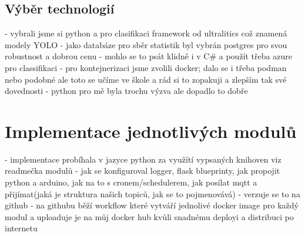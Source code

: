 \subsection{Výběr technologií}\label{subsec:vyber-technologii}
- vybrali jsme si python a pro clasifikaci framework od ultralitics což znamená modely YOLO\newline
- jako databáze pro sběr statistik byl vybrán postgres pro svou robustnost a dobrou cenu\newline
- mohlo se to psát klidně i v C\# a použít třeba azure pro classifikaci\newline
- pro kontejnerizaci jsme zvolili docker; dalo se i třeba podman nebo podobné ale toto se učíme ve škole a rád si to zopakuji a zlepším tak své dovednosti\newline
- python pro mě byla trochu výzva ale dopadlo to dobře


\section{Implementace jednotlivých modulů}\label{sec:implementace-jednotlivych-modulu}
- implementace probíhala v jazyce python za využítí vypsaných knihoven viz readmečka modulů\newline
- jak se konfiguroval logger, flask blueprinty, jak propojit python a arduino, jak na to s cronem/schedulerem, jak posílat mqtt a přijímat(jaká je struktura našich topiců, jak se to pojmenovává)
- verzuje se to na github
- na githubu běží workflow které vytváří jednolivé docker image pro každý modul a uploaduje je na můj docker hub kvůli snadnému deployi a distribuci po internetu


